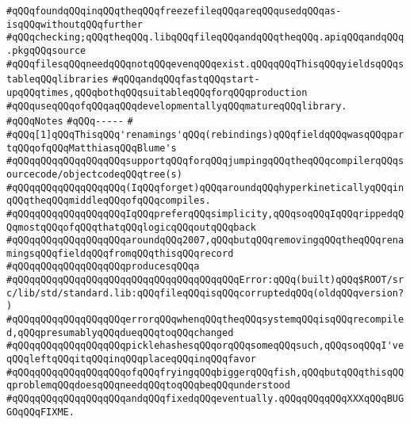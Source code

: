 \verb|#qQQqfoundqQQqinqQQqtheqQQqfreezefileqQQqareqQQqusedqQQqas-isqQQqwithoutqQQqfurther|\newline
\verb|#qQQqchecking;qQQqtheqQQq.libqQQqfileqQQqandqQQqtheqQQq.apiqQQqandqQQq.pkgqQQqsource|\newline
\verb|#qQQqfilesqQQqneedqQQqnotqQQqevenqQQqexist.qQQqqQQqThisqQQqyieldsqQQqstableqQQqlibraries|\newline
\verb|#qQQqandqQQqfastqQQqstart-upqQQqtimes,qQQqbothqQQqsuitableqQQqforqQQqproduction|\newline
\verb|#qQQquseqQQqofqQQqaqQQqdevelopmentallyqQQqmatureqQQqlibrary.|\newline
\newline
\verb|#qQQqNotes|\newline
\verb|#qQQq-----|\newline
\verb|#|\newline
\verb|#qQQq[1]qQQqThisqQQq'renamings'qQQq(rebindings)qQQqfieldqQQqwasqQQqpartqQQqofqQQqMatthiasqQQqBlume's|\newline
\verb|#qQQqqQQqqQQqqQQqqQQqsupportqQQqforqQQqjumpingqQQqtheqQQqcompilerqQQqsourcecode/objectcodeqQQqtree(s)|\newline
\verb|#qQQqqQQqqQQqqQQqqQQq(IqQQqforget)qQQqaroundqQQqhyperkineticallyqQQqinqQQqtheqQQqmiddleqQQqofqQQqcompiles.|\newline
\verb|#qQQqqQQqqQQqqQQqqQQqIqQQqpreferqQQqsimplicity,qQQqsoqQQqIqQQqrippedqQQqmostqQQqofqQQqthatqQQqlogicqQQqoutqQQqback|\newline
\verb|#qQQqqQQqqQQqqQQqqQQqaroundqQQq2007,qQQqbutqQQqremovingqQQqtheqQQqrenamingsqQQqfieldqQQqfromqQQqthisqQQqrecord|\newline
\verb|#qQQqqQQqqQQqqQQqqQQqproducesqQQqa|\newline
\verb|#qQQqqQQqqQQqqQQqqQQqqQQqqQQqqQQqqQQqqQQqError:qQQq(built)qQQq$ROOT/src/lib/std/standard.lib:qQQqfileqQQqisqQQqcorruptedqQQq(oldqQQqversion?)|\newline
\verb|#qQQqqQQqqQQqqQQqqQQqerrorqQQqwhenqQQqtheqQQqsystemqQQqisqQQqrecompiled,qQQqpresumablyqQQqdueqQQqtoqQQqchanged|\newline
\verb|#qQQqqQQqqQQqqQQqqQQqpicklehashesqQQqorqQQqsomeqQQqsuch,qQQqsoqQQqI'veqQQqleftqQQqitqQQqinqQQqplaceqQQqinqQQqfavor|\newline
\verb|#qQQqqQQqqQQqqQQqqQQqofqQQqfryingqQQqbiggerqQQqfish,qQQqbutqQQqthisqQQqproblemqQQqdoesqQQqneedqQQqtoqQQqbeqQQqunderstood|\newline
\verb|#qQQqqQQqqQQqqQQqqQQqandqQQqfixedqQQqeventually.qQQqqQQqqQQqXXXqQQqBUGGOqQQqFIXME.|\newline
\newline

